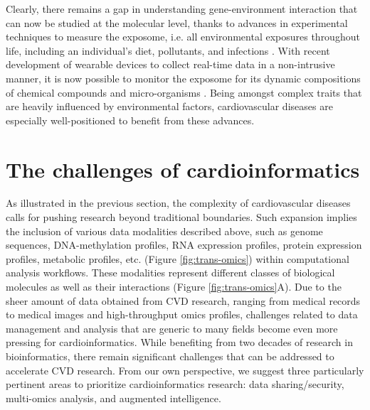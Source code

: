\documentclass[letter]{bioinfo}
\begin{document}
	Clearly, there remains a gap in understanding gene-environment interaction that can now be studied at the molecular level, thanks to advances in experimental techniques to measure the exposome, i.e. all environmental exposures throughout life, including an individual's diet, pollutants, and infections \citep{Wild:2005:Complementing}. With recent development of wearable devices to collect real-time data in a non-intrusive manner, it is now possible to monitor the exposome for its dynamic compositions of chemical compounds and micro-organisms \citep{Warth:2017:ExposomeScale, Jiang:2018:Dynamic}. Being amongst complex traits that are heavily influenced by environmental factors, cardiovascular diseases are especially well-positioned to benefit from these advances.
	
	\section*{The challenges of cardioinformatics}
	As illustrated in the previous section, the complexity of cardiovascular diseases calls for pushing research beyond traditional boundaries.
	Such expansion implies the inclusion of various data modalities described above, such as genome sequences, DNA-methylation profiles, RNA expression profiles, protein expression profiles, metabolic profiles, etc. (Figure \ref{fig:trans-omics}) within computational analysis workflows. These modalities represent different classes of biological molecules as well as their interactions (Figure \ref{fig:trans-omics}A). Due to the sheer amount of data obtained from CVD research, ranging from medical records to medical images and high-throughput omics profiles, challenges related to data management and analysis that are generic to many fields become even more pressing for cardioinformatics. While benefiting from two decades of research in bioinformatics, there remain significant challenges that can be addressed to accelerate CVD research. From our own perspective, we suggest three particularly pertinent areas to prioritize cardioinformatics research: data sharing/security, multi-omics analysis, and augmented intelligence.
	
	
\end{document}
